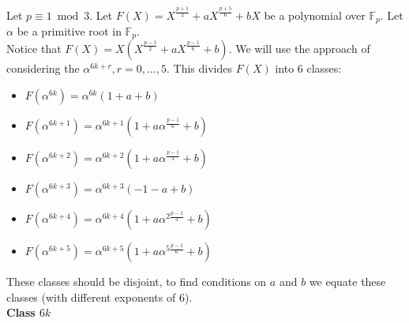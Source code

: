 \documentclass[12pt]{article}
\begin{document}
Let $p \equiv 1 \bmod{3}$. Let $F(X)=X^{\frac{p+1}{2}}+aX^{\frac{p+5}{6}}+bX$ be a polynomial over $\mathbb{F}_{p}$. Let $\alpha$ be a primitive root in $\mathbb{F}_{p}$.
\\
Notice that $F(X)=X(X^{\frac{p-1}{2}}+aX^{\frac{p-1}{6}}+b)$. We will use the approach of considering the $\alpha^{6k+r},r=0,...,5$. This divides $F(X)$ into 6 classes:

\begin{itemize}
	\item
		$F(\alpha^{6k}) = \alpha^{6k}(1+a+b)$
	\item
		$F(\alpha^{6k+1})= \alpha^{6k+1}(1+a\alpha^{\frac{p-1}{6}}+b)$
	\item
		$F(\alpha^{6k+2})=\alpha^{6k+2}(1+a\alpha^{\frac{p-1}{3}}+b)$
	\item
		$F(\alpha^{6k+3})=\alpha^{6k+3}(-1-a+b)$
	\item
		$F(\alpha^{6k+4})=\alpha^{6k+4}(1+a\alpha^{2\frac{p-1}{3}}+b)$
	\item
		$F(\alpha^{6k+5})=\alpha^{6k+5}(1+a\alpha^{5\frac{p-1}{6}}+b)$
\end{itemize}

These classes should be disjoint, to find conditions on $a$ and $b$ we equate these classes (with different exponents of $6$).
\\

\textbf{Class $6k$}
\end{document}
